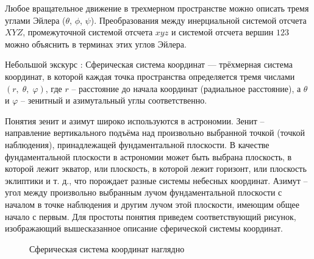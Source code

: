 \documentclass[a4paper,11.5pt]{article} %
\begin{document}
Любое вращательное движение в трехмерном пространстве можно описать тремя углами Эйлера ($\theta$, $\phi$, $\psi$). Преобразования между инерциальной системой отсчета $XYZ$, промежуточной системой отсчета $xyz$ и системой отсчета вершин $123$ можно объяснить в терминах этих углов Эйлера.

Небольшой экскурс : Сферическая система координат — трёхмерная система координат, в которой каждая точка пространства определяется тремя числами ${\displaystyle (r,\;\theta ,\;\varphi )}$, где ${\displaystyle r}$ -- расстояние до начала координат (радиальное расстояние), а ${\displaystyle \theta }$  и ${\displaystyle \varphi }$  -- зенитный и азимутальный углы соответственно. 

Понятия зенит и азимут широко используются в астрономии. Зенит -- направление вертикального подъёма над произвольно выбранной точкой (точкой наблюдения), принадлежащей фундаментальной плоскости. В качестве фундаментальной плоскости в астрономии может быть выбрана плоскость, в которой лежит экватор, или плоскость, в которой лежит горизонт, или плоскость эклиптики и т. д., что порождает разные системы небесных координат. Азимут -- угол между произвольно выбранным лучом фундаментальной плоскости с началом в точке наблюдения и другим лучом этой плоскости, имеющим общее начало с первым. Для простоты понятия приведем соответствующий рисунок, изображающий вышесказанное описание сферической системы координат.

\begin{figure}[h]
	\caption{Сферическая система координат наглядно}
	\label{Angles}
\end{figure}
\end{document}
